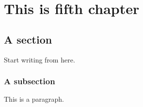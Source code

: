 \chapter{This is fifth chapter}
\section{A section}
Start writing from here.
\subsection{A subsection}
This is a paragraph.
